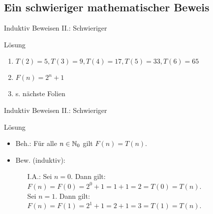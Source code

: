 \subsection{Ein schwieriger mathematischer Beweis}
\begin{frame}{Induktiv Beweisen II.: Schwieriger}
	\begin{block}{Lösung}
		\begin{enumerate}
			\item $ T(2)=5,T(3)=9, T(4)=17, T(5)=33, T(6)=65$
			\item $F(n) = 2^n+1$
			\item s. nächste Folien
		\end{enumerate}
	\end{block}
\end{frame}
\begin{frame}{Induktiv Beweisen II.: Schwieriger}
	\begin{block}{Lösung}
		 	\begin{itemize}
		 		\item Beh.: Für alle $n \in \mathbb{N}_0$ gilt $F(n) = T(n)$.
		 		\item Bew. (induktiv): 
				\begin{itemize}
					\item[I.A.:]
								Sei $n=0$. Dann gilt: \\ 
								\qquad $F(n)=F(0)=2^0+1=1+1=2=T(0)=T(n)$.\\
							 	Sei $n=1$. Dann gilt: \\
							 	\qquad $F(n)=F(1)=2^1+1=2+1=3=T(1)=T(n)$.
				\end{itemize}
		 	\end{itemize}				  
	\end{block}
\end{frame}
